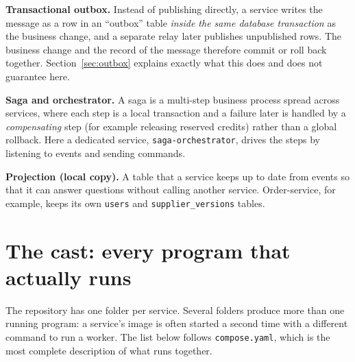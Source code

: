 \documentclass[11pt,a4paper]{article}
\newcommand{\code}[1]{\nolinkurl{#1}}
\begin{document}
\textbf{Transactional outbox.} Instead of publishing directly, a service writes the
message as a row in an ``outbox'' table \emph{inside the same database transaction} as
the business change, and a separate relay later publishes unpublished rows. The business
change and the record of the message therefore commit or roll back together.
Section~\ref{sec:outbox} explains exactly what this does and does not guarantee here.

\textbf{Saga and orchestrator.} A saga is a multi-step business process spread across
services, where each step is a local transaction and a failure later is handled by a
\emph{compensating} step (for example releasing reserved credits) rather than a global
rollback. Here a dedicated service, \code{saga-orchestrator}, drives the steps by
listening to events and sending commands.

\textbf{Projection (local copy).} A table that a service keeps up to date from events so
that it can answer questions without calling another service. Order-service, for example,
keeps its own \code{users} and \code{supplier_versions} tables.

\section{The cast: every program that actually runs}
\label{sec:cast}

The repository has one folder per service. Several folders produce more than one running
program: a service's image is often started a second time with a different command to
run a worker. The list below follows \code{compose.yaml}, which is the most complete
description of what runs together.
\end{document}
